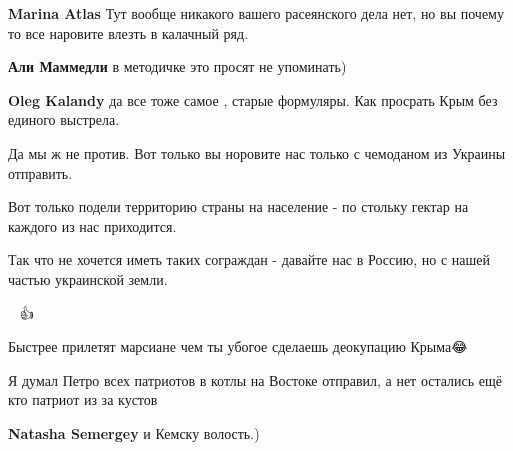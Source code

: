 \begin{itemize}
\begin{itemize}
\textbf{Marina Atlas} Тут вообще никакого вашего расеянского дела нет, но вы почему то все наровите влезть в калачный ряд.

 
\textbf{Али Маммедли} в методичке это просят не упоминать)

 
\textbf{Oleg Kalandy} да все тоже самое , старые формуляры. Как просрать Крым без единого выстрела.

 

Да мы ж не против. Вот только вы норовите нас только с чемоданом из Украины отправить.

Вот только подели территорию страны на население - по стольку гектар на каждого из нас приходится.

Так что не хочется иметь таких сограждан - давайте нас в Россию, но с нашей частью украинской земли.


 
👏👏👏👍

 

Быстрее прилетят марсиане чем ты убогое сделаешь деокупацию Крыма😂

Я думал Петро всех патриотов в котлы на Востоке отправил, а нет остались ещё кто патриот из за кустов


 
\textbf{Natasha Semergey} и Кемску волость.)

\end{itemize}

\end{itemize}

